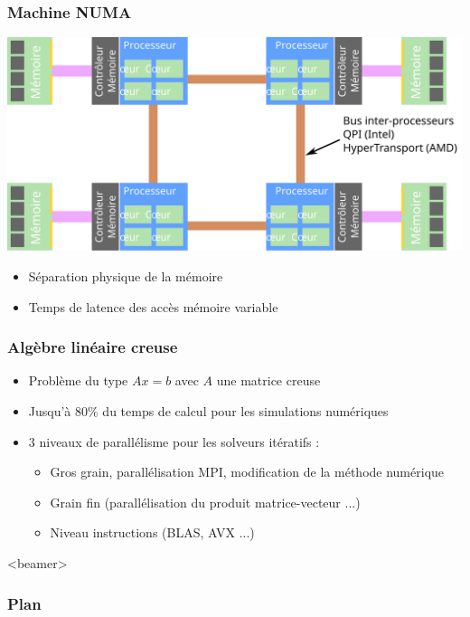 \documentclass{beamer}
\begin{document}
\begin{frame}
  \frametitle{Machine NUMA}
  \centerline{\includegraphics[width=0.8\linewidth]{numa}}

  \begin{itemize}
    \item Séparation physique de la mémoire
    \item Temps de latence des accès mémoire variable
  \end{itemize}

\end{frame}


\begin{frame}
  \frametitle{Algèbre linéaire creuse}

  \begin{itemize}
    \item Problème du type $Ax=b$ avec $A$ une matrice creuse
    \item Jusqu'à 80\% du temps de calcul pour les simulations numériques
    \item 3 niveaux de parallélisme pour les solveurs itératifs :
    \begin{itemize}
      \item Gros grain, parallélisation MPI, modification de la méthode numérique
      \item Grain fin (parallélisation du produit matrice-vecteur ...)
      \item Niveau instructions (BLAS, AVX ...)
    \end{itemize}
  \end{itemize}

\end{frame}

  \begin{frame}<beamer>
    \frametitle{Plan}
    \tableofcontents
  \end{frame}
\end{document}
